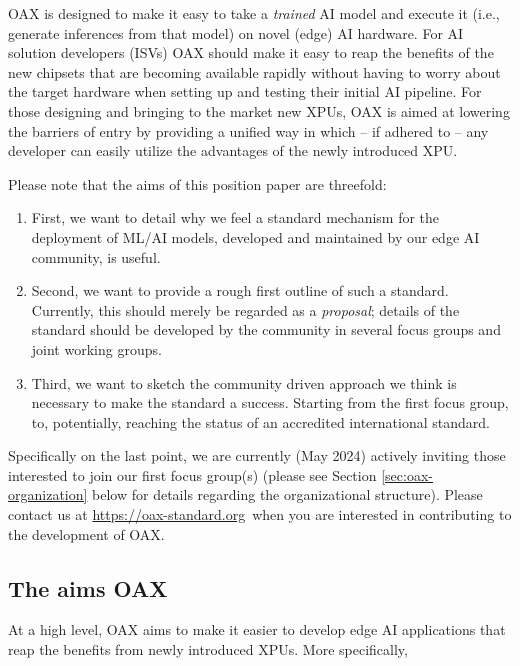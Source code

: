\documentclass{article}
\newcommand{\oaxweb}{\href{https://oax-standard.org}{https://oax-standard.org}}
\begin{document}
OAX is designed to make it easy to take a \emph{trained} AI model and execute it (i.e., generate inferences from that model) on novel (edge) AI hardware. For AI solution developers (ISVs) OAX should make it easy to reap the benefits of the new chipsets that are becoming available rapidly without having to worry about the target hardware when setting up and testing their initial AI pipeline. For those designing and bringing to the market new XPUs, OAX is aimed at lowering the barriers of entry by providing a unified way in which -- if adhered to -- any developer can easily utilize the advantages of the newly introduced XPU. 

Please note that the aims of this position paper are threefold:
\begin{enumerate}
\item First, we want to detail why we feel a standard mechanism for the deployment of ML/AI models, developed and maintained by our edge AI community, is useful.
\item Second, we want to provide a rough first outline of such a standard. Currently, this should merely be regarded as a \emph{proposal}; details of the standard should be developed by the community in several focus groups and joint working groups.
\item Third, we want to sketch the community driven approach we think is necessary to make the standard a success. Starting from the first focus group, to, potentially, reaching the status of an accredited international standard.
\end{enumerate}
Specifically on the last point, we are currently (May 2024) actively inviting those interested to join our first focus group(s) (please see Section \ref{sec:oax-organization} below for details regarding the organizational structure). Please contact us at \oaxweb ~when you are interested in contributing to the development of OAX.

\subsection{The aims OAX}

At a high level, OAX aims to make it easier to develop edge AI applications that reap the benefits from newly introduced XPUs. More specifically, 
\end{document}
